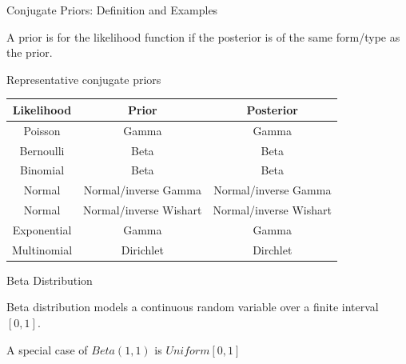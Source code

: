 \documentclass[handout,fleqn,aspectratio=169]{beamer}
\begin{document}
\begin{frame}{Conjugate Priors: Definition and Examples}

\plitemsep 0.1in

\bci 

\item {} A prior is  for the likelihood function if the posterior is of the same form/type as the prior.

\item Representative conjugate priors

\begin{center}
\medskip
\begin{tabular}{|c|c|c|} \hline
Likelihood & Prior & Posterior \\ \hline \hline
Poisson & Gamma & Gamma \\ \hline
Bernoulli & Beta & Beta \\ \hline
Binomial & Beta & Beta \\ \hline
Normal & Normal/inverse Gamma & Normal/inverse Gamma \\ \hline
Normal & Normal/inverse Wishart & Normal/inverse Wishart \\ \hline
Exponential & Gamma & Gamma \\ \hline
Multinomial & Dirichlet & Dirchlet \\ \hline
\end{tabular}
\end{center}
\eci
\end{frame}

\begin{frame}{Beta Distribution}



\plitemsep 0.05in
\bci 

\item Beta distribution models a continuous random variable over a finite interval $[0,1].$
\item<2-> A special case of $Beta(1,1)$ is $Uniform[0,1]$

\eci

\end{frame}
\end{document}
